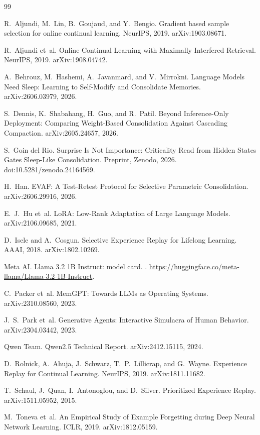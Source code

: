 \documentclass[11pt,a4paper]{article}
\begin{document}
\clearpage
\begin{thebibliography}{99}

R.~Aljundi, M.~Lin, B.~Goujaud, and Y.~Bengio.
\newblock Gradient based sample selection for online continual learning.
\newblock NeurIPS, 2019. arXiv:1903.08671.

R.~Aljundi et~al.
\newblock Online Continual Learning with Maximally Interfered Retrieval.
\newblock NeurIPS, 2019. arXiv:1908.04742.

A.~Behrouz, M.~Hashemi, A.~Javanmard, and V.~Mirrokni.
\newblock Language Models Need Sleep: Learning to Self-Modify and Consolidate Memories.
\newblock arXiv:2606.03979, 2026.

S.~Dennis, K.~Shabahang, H.~Guo, and R.~Patil.
\newblock Beyond Inference-Only Deployment: Comparing Weight-Based Consolidation Against Cascading Compaction.
\newblock arXiv:2605.24657, 2026.

S.~Goin del Rio.
\newblock Surprise Is Not Importance: Criticality Read from Hidden States Gates Sleep-Like Consolidation.
\newblock Preprint, Zenodo, 2026. doi:10.5281/zenodo.24164569.

H.~Han.
\newblock EVAF: A Test-Retest Protocol for Selective Parametric Consolidation.
\newblock arXiv:2606.29916, 2026.

E.~J.~Hu et~al.
\newblock LoRA: Low-Rank Adaptation of Large Language Models.
\newblock arXiv:2106.09685, 2021.

D.~Isele and A.~Cosgun.
\newblock Selective Experience Replay for Lifelong Learning.
\newblock AAAI, 2018. arXiv:1802.10269.

Meta AI.
\newblock Llama 3.2 1B Instruct: model card.
. \url{https://huggingface.co/meta-llama/Llama-3.2-1B-Instruct}.

C.~Packer et~al.
\newblock MemGPT: Towards LLMs as Operating Systems.
\newblock arXiv:2310.08560, 2023.

J.~S.~Park et~al.
\newblock Generative Agents: Interactive Simulacra of Human Behavior.
\newblock arXiv:2304.03442, 2023.

Qwen Team.
\newblock Qwen2.5 Technical Report.
\newblock arXiv:2412.15115, 2024.

D.~Rolnick, A.~Ahuja, J.~Schwarz, T.~P.~Lillicrap, and G.~Wayne.
\newblock Experience Replay for Continual Learning.
\newblock NeurIPS, 2019. arXiv:1811.11682.

T.~Schaul, J.~Quan, I.~Antonoglou, and D.~Silver.
\newblock Prioritized Experience Replay.
\newblock arXiv:1511.05952, 2015.

M.~Toneva et~al.
\newblock An Empirical Study of Example Forgetting during Deep Neural Network Learning.
\newblock ICLR, 2019. arXiv:1812.05159.

\end{thebibliography}
\end{document}
